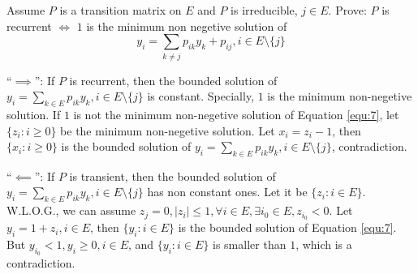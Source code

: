 \documentclass{ctexart}
\begin{document}

\begin{problem}\label{pro:7}
  Assume \(P\) is a transition matrix on \(E\) and \(P\) is irreducible, \(j \in E\).
  Prove: \(P\) is recurrent \(\iff\) \(1\) is the minimum non negetive solution of
  \begin{equation}\label{equ:7}
    y_i = \sum_{k \neq j} p_{ik}y_k + p_{ij}, i \in E\setminus\{j\}
  \end{equation}
\end{problem}
\begin{solution}
  ``\(\implies\)'': If \(P\) is recurrent, then the bounded solution of \(y_i=\sum_{k \in E}p_{ik}y_k, i  \in E\setminus\{j\}\) is constant.
  Specially, \(1\) is the minimum non-negetive solution.
  If \(1\) is not the minimum non-negetive solution of Equation \eqref{equ:7}, let \(\{z_i:i \geq 0\}\) be the minimum
  non-negetive solution. Let \(x_i=z_i-1\), then \(\{x_i:i \geq 0\}\) is the bounded solution of
  \(y_i = \sum_{k \in E}p_{ik}y_k, i \in E\setminus\{j\}\), contradiction.

  ``\(\impliedby\)'': If \(P\) is transient, then the bounded solution of \(y_i=\sum_{k \in E}p_{ik}y_k, i  \in E\setminus\{j\}\) has non constant ones.
  Let it be \(\{z_i:i \in E\}\). W.L.O.G., we can assume \(z_j=0,|z_i| \leq 1, \forall i \in E, \exists i_0 \in E, z_{i_0} <0\).
  Let \(y_i = 1 + z_i, i \in E\), then \(\{y_i: i \in E\}\) is the bounded solution of Equation \eqref{equ:7}.
  But \(y_{i_0} <1, y_i \geq 0, i \in E\), and \(\{y_i: i \in E\}\) is smaller than \(1\), which is a contradiction.
\end{solution}
\end{document}

